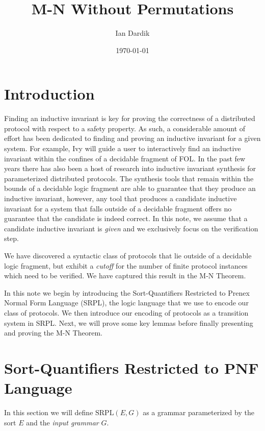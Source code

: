 \documentclass[12pt]{article}
\title{M-N Without Permutations}
\author{Ian Dardik}
\date{\today}
\theoremstyle{definition}
\theoremstyle{remark}
\newcommand{\SRPL}{\text{SRPL}}
\begin{document}
\maketitle

\section{Introduction}
Finding an inductive invariant is key for proving the correctness of a distributed protocol with respect to a safety property.  As such, a considerable amount of effort has been dedicated to finding and proving an inductive invariant for a given system.  For example, Ivy will guide a user to interactively find an inductive invariant within the confines of a decidable fragment of FOL.  In the past few years there has also been a host of research into inductive invariant synthesis for parameterized distributed protocols.  The synthesis tools that remain within the bounds of a decidable logic fragment are able to guarantee that they produce an inductive invariant, however, any tool that produces a candidate inductive invariant for a system that falls outside of a decidable fragment offers no guarantee that the candidate is indeed correct.  In this note, we assume that a candidate inductive invariant is \textit{given} and we exclusively focus on the verification step.

We have discovered a syntactic class of protocols that lie outside of a decidable logic fragment, but exhibit a \textit{cutoff} for the number of finite protocol instances which need to be verified.  We have captured this result in the M-N Theorem.

In this note we begin by introducing the Sort-Quantifiers Restricted to Prenex Normal Form Language (SRPL), the logic language that we use to encode our class of protocols.  We then introduce our encoding of protocols as a transition system in SRPL.  Next, we will prove some key lemmas before finally presenting and proving the M-N Theorem.



\section{Sort-Quantifiers Restricted to PNF Language}

In this section we will define $\SRPL(E,G)$ as a grammar parameterized by the sort $E$ and the \textit{input grammar} $G$.
\end{document}
